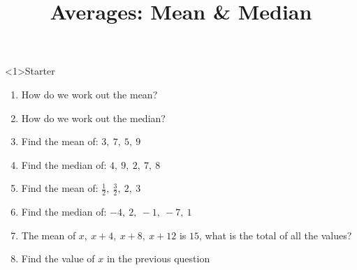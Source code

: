 \documentclass{beamer}
\title{Averages: Mean \& Median}
\author{}
\date{}
\newcommand{\ashow}[1]{\uncover<2->{\textcolor{red}{\small #1}}}
\newcommand{\ashowq}[1]{\alt<2->{\textcolor{red}{\small #1}}{?}}
\begin{document}
\begin{frame}<1>{Starter}
\vspace{-0.8em}

\footnotesize
\begin{enumerate}\itemsep2pt
  \item How do we work out the mean? \ashow{Add the values and divide by how many there are.}
  \item How do we work out the median? \ashow{Order the data and find the middle value.}
  \item Find the mean of: $3,\ 7,\ 5,\ 9$ \ashow{$=6$}
  \item Find the median of: $4,\ 9,\ 2,\ 7,\ 8$ \ashow{$=7$}
  \item Find the mean of: $\frac{1}{2},\ \frac{3}{2},\ 2,\ 3$ \ashow{$=\frac{7}{4}$}
  \item Find the median of: $-4,\ 2,\ -1,\ -7,\ 1$ \ashow{$=-1$}
  \item The mean of $x,\ x+4,\ x+8,\ x+12$ is $15$, what is the total of all the values? \ashow{$60$}
  \item Find the value of $x$ in the previous question \ashow{$x=9$}
\end{enumerate}

\end{frame}
\end{document}
